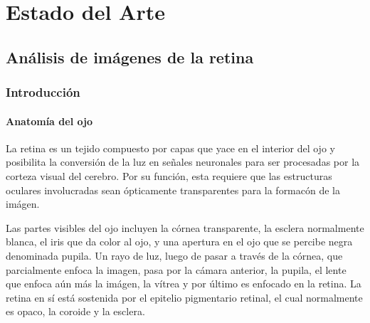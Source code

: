 
\chapter{Estado del Arte} %

\label{Chapter2} %


\section{An\'alisis  de im\'agenes de la retina}

	\subsection{Introducci\'on}
	
		\subsubsection{Anatom\'ia del ojo}

La retina es un tejido compuesto por capas que yace en el interior del ojo y posibilita la conversi\'on de la luz en se\~nales neuronales para ser procesadas por la corteza visual del cerebro. Por su funci\'on, esta requiere que las estructuras oculares involucradas sean \'opticamente transparentes para la formac\'on de la im\'agen.

Las partes visibles del ojo incluyen la córnea transparente, la esclera normalmente blanca, el iris que da color al ojo, y una apertura en el ojo que se percibe negra denominada pupila. Un rayo de luz, luego de pasar a través de la córnea, que parcialmente enfoca la imagen, pasa por la cámara anterior, la pupila, el lente que enfoca aún más la imágen, la vítrea y por último es enfocado en la retina. La retina en sí está sostenida por el epitelio pigmentario retinal, el cual normalmente es opaco, la coroide y la esclera.

